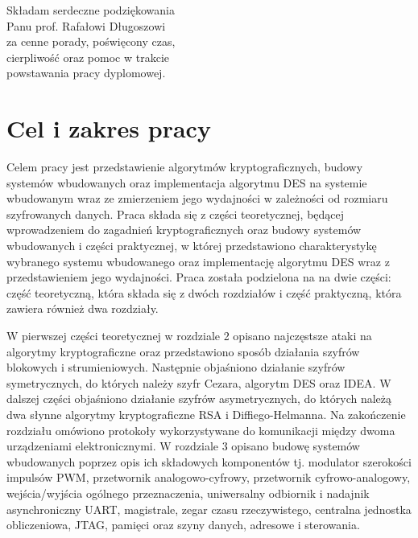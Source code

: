 \documentclass[12p]{article}
\begin{document}
\thispagestyle{empty}
\vspace*{\fill}
\begin{flushright}
Składam serdeczne podziękowania\\
Panu prof. Rafałowi Długoszowi\\
za cenne porady, poświęcony czas,\\
cierpliwość oraz pomoc w trakcie\\
powstawania pracy dyplomowej.
\end{flushright}
\newpage
\tableofcontents
\newpage


\section{Cel i zakres pracy}
\quad Celem pracy jest przedstawienie algorytmów kryptograficznych, budowy systemów wbudowanych oraz implementacja algorytmu DES na systemie wbudowanym wraz ze zmierzeniem jego wydajności w zależności od rozmiaru szyfrowanych danych. Praca składa się z części teoretycznej, będącej wprowadzeniem do zagadnień kryptograficznych oraz budowy systemów wbudowanych i części praktycznej, w której przedstawiono charakterystykę wybranego systemu wbudowanego oraz implementację algorytmu DES wraz z przedstawieniem jego wydajności. Praca została podzielona na na dwie części: część teoretyczną, która składa się z dwóch rozdziałów i część praktyczną, która zawiera również dwa rozdziały. 

W pierwszej części teoretycznej w rozdziale 2 opisano najczęstsze ataki na algorytmy kryptograficzne oraz przedstawiono sposób działania szyfrów blokowych i strumieniowych. Następnie objaśniono działanie szyfrów symetrycznych, do których należy szyfr Cezara, algorytm DES oraz IDEA. W dalszej części objaśniono działanie szyfrów asymetrycznych, do których należą dwa słynne algorytmy kryptograficzne RSA i Diffiego-Helmanna. Na zakończenie rozdziału omówiono protokoły wykorzystywane do komunikacji między dwoma urządzeniami elektronicznymi. W rozdziale 3 opisano budowę systemów wbudowanych poprzez opis ich składowych komponentów tj. modulator szerokości impulsów PWM, przetwornik analogowo-cyfrowy, przetwornik cyfrowo-analogowy, wejścia/wyjścia ogólnego przeznaczenia, uniwersalny odbiornik i nadajnik asynchroniczny UART, magistrale, zegar czasu rzeczywistego, centralna jednostka obliczeniowa, JTAG, pamięci oraz szyny danych, adresowe i sterowania. 
\end{document}
